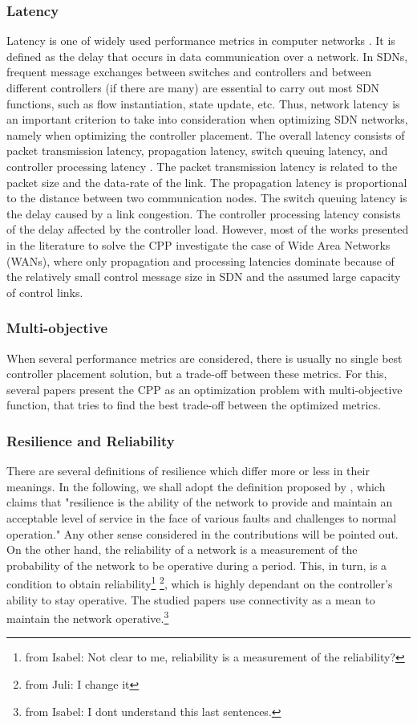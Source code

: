 \documentclass{IEEEtran}
\newcommand\fia[1]{{\color{red}\footnote{\color{red}from Isabel: #1}}} %
\newcommand\juli[1]{{\color{magenta}\footnote{\color{magenta}from Juli: #1}}}
\begin{document}
\subsubsection{Latency}
Latency is one of widely used performance metrics in computer networks \cite{SiHa15}. It is defined as the delay that occurs in data communication over a network. In SDNs, frequent message exchanges between switches and controllers and between different controllers (if there are many) are essential to carry out most SDN functions, such as flow instantiation, state update, etc. Thus, network latency is an important criterion to take into consideration when optimizing SDN networks, namely when optimizing the controller placement. The overall latency consists of packet transmission latency, propagation latency, switch queuing latency, and controller processing latency \cite{WaZh17}. The packet transmission latency is related to the packet size and the data-rate of the link. The propagation latency is proportional to the distance between two communication nodes. The switch queuing latency is the delay caused by a link congestion. The controller processing latency consists of the delay affected by the controller load. However, most of the works presented in the literature to solve the CPP investigate the case of Wide Area Networks (WANs), where only propagation and processing latencies dominate because of the relatively small control message size in SDN and the assumed large capacity of control links. 
\subsubsection{Multi-objective}
When several performance metrics are considered, there is usually no single best controller placement solution, but a trade-off between these metrics. For this, several papers present the CPP as an optimization problem with multi-objective function, that tries to find the best trade-off between the optimized metrics.
\subsubsection{Resilience and Reliability}
There are several definitions of resilience which differ more or less in their meanings. In the following, we shall adopt the definition proposed by \cite{StHu07}, which claims that "resilience is the ability of the network to provide and maintain an acceptable level of service in the face of various faults and challenges to normal operation."  Any other sense considered in the contributions will be pointed out. On the other hand, the reliability of a network is a measurement of the probability of the network to be operative during a period. This, in turn, is a condition to obtain reliability\fia{Not clear to me, reliability is a measurement of the reliability?} \juli{I change it}, which is highly dependant on the controller's ability to stay operative. The studied papers use connectivity as a mean to maintain the network operative.\fia{I dont understand this last sentences.}
\end{document}
